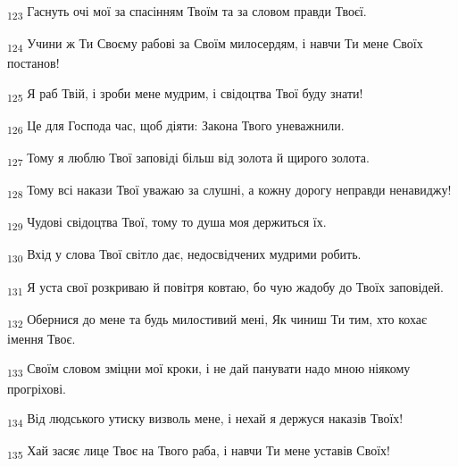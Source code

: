 \begin{tcolorbox}
\textsubscript{123} Гаснуть очі мої за спасінням Твоїм та за словом правди Твоєї.
\end{tcolorbox}
\begin{tcolorbox}
\textsubscript{124} Учини ж Ти Своєму рабові за Своїм милосердям, і навчи Ти мене Своїх постанов!
\end{tcolorbox}
\begin{tcolorbox}
\textsubscript{125} Я раб Твій, і зроби мене мудрим, і свідоцтва Твої буду знати!
\end{tcolorbox}
\begin{tcolorbox}
\textsubscript{126} Це для Господа час, щоб діяти: Закона Твого уневажнили.
\end{tcolorbox}
\begin{tcolorbox}
\textsubscript{127} Тому я люблю Твої заповіді більш від золота й щирого золота.
\end{tcolorbox}
\begin{tcolorbox}
\textsubscript{128} Тому всі накази Твої уважаю за слушні, а кожну дорогу неправди ненавиджу!
\end{tcolorbox}
\begin{tcolorbox}
\textsubscript{129} Чудові свідоцтва Твої, тому то душа моя держиться їх.
\end{tcolorbox}
\begin{tcolorbox}
\textsubscript{130} Вхід у слова Твої світло дає, недосвідчених мудрими робить.
\end{tcolorbox}
\begin{tcolorbox}
\textsubscript{131} Я уста свої розкриваю й повітря ковтаю, бо чую жадобу до Твоїх заповідей.
\end{tcolorbox}
\begin{tcolorbox}
\textsubscript{132} Обернися до мене та будь милостивий мені, Як чиниш Ти тим, хто кохає імення Твоє.
\end{tcolorbox}
\begin{tcolorbox}
\textsubscript{133} Своїм словом зміцни мої кроки, і не дай панувати надо мною ніякому прогріхові.
\end{tcolorbox}
\begin{tcolorbox}
\textsubscript{134} Від людського утиску визволь мене, і нехай я держуся наказів Твоїх!
\end{tcolorbox}
\begin{tcolorbox}
\textsubscript{135} Хай засяє лице Твоє на Твого раба, і навчи Ти мене уставів Своїх!
\end{tcolorbox}
